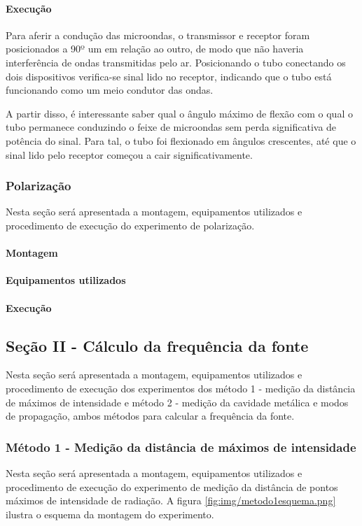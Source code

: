 \documentclass[12pt]{article}
\begin{document}
\paragraph{Execução}
Para aferir a condução das microondas, o transmissor e receptor foram
posicionados a 90º um em relação ao outro, de modo que não haveria
interferência de ondas transmitidas pelo ar. Posicionando o tubo
conectando os dois dispositivos verifica-se sinal lido no receptor,
indicando que o tubo está funcionando como um meio condutor das ondas.

A partir disso, é interessante saber qual o ângulo máximo de flexão
com o qual o tubo permanece conduzindo o feixe de microondas sem
perda significativa de potência do sinal. Para tal, o tubo foi
flexionado em ângulos crescentes, até que o sinal lido pelo receptor
começou a cair significativamente.

\subsubsection{Polarização}
Nesta seção será apresentada a montagem, equipamentos utilizados e
procedimento de execução do experimento de polarização.

\paragraph{Montagem}
\paragraph{Equipamentos utilizados}
\paragraph{Execução}

\subsection{Seção II - Cálculo da frequência da fonte}
Nesta seção será apresentada a montagem, equipamentos utilizados e
procedimento de execução dos experimentos dos método 1 - medição da
distância de máximos de intensidade e método 2 - medição da cavidade
metálica e modos de propagação, ambos métodos para calcular a
frequência da fonte.

\subsubsection{Método 1 - Medição da distância de máximos de intensidade}
Nesta seção será apresentada a montagem, equipamentos utilizados e
procedimento de execução do experimento de medição da distância de
pontos máximos de intensidade de radiação. A figura
\ref{fig:img/metodo1esquema.png}
ilustra o esquema da montagem do experimento.
\end{document}
